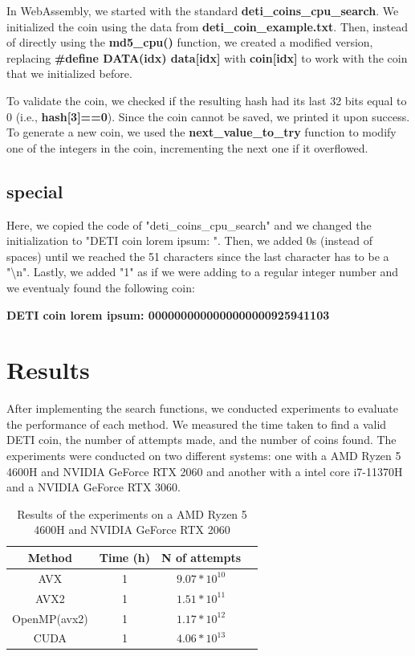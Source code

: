 \documentclass[a4paper,12pt]{article}
\begin{document}
In WebAssembly, we started with the standard \textbf{deti\_coins\_cpu\_search}. 
We initialized the coin using the data from \textbf{deti\_coin\_example.txt}. 
Then, instead of directly using the \textbf{md5\_cpu()} function, we created a modified version, 
replacing \textbf{\#define DATA(idx) data[idx]} with \textbf{coin[idx]} to work with the coin that we initialized before.

To validate the coin, we checked if the resulting hash had its last 32 bits equal to 0 (i.e., \textbf{hash[3]==0}). 
Since the coin cannot be saved, we printed it upon success. 
To generate a new coin, we used the \textbf{next\_value\_to\_try} function to modify one of the integers in the coin, 
incrementing the next one if it overflowed.

\subsection{special}
\label{subsec:special}

Here, we copied the code of "deti\_coins\_cpu\_search" and we changed the initialization to "DETI coin lorem ipsum: ". 
Then, we added 0s (instead of spaces) until we reached the 51 characters since the last character has to be a "\textbackslash n". 
Lastly, we added "1" as if we were adding to a regular integer number and we eventualy found the following coin:

\textbf{DETI coin lorem ipsum: 0000000000000000000925941103}

\section{Results}
\label{sec:results}

After implementing the search functions, we conducted experiments to evaluate the performance
of each method. We measured the time taken to find a valid DETI coin, the number of attempts
made, and the number of coins found. The experiments were conducted on two different systems:
one with a AMD Ryzen 5 4600H and NVIDIA GeForce RTX 2060 and another with a intel core i7-11370H and a NVIDIA GeForce RTX 
3060.

\begin{table}[H]
    \centering
    \begin{tabular}{|c|c|c|c|}
        \hline
        \textbf{Method} & \textbf{Time (h)} & \textbf{N of attempts}\\
        \hline
        AVX & 1 & $9.07*10^{10}$   \\
        AVX2 & 1 & $1.51*10^{11}$ \\
        OpenMP(avx2) & 1 & $1.17*10^{12}$ \\
        CUDA & 1 & $4.06*10^{13}$   \\
        \hline
    \end{tabular}
    \caption{Results of the experiments on a AMD Ryzen 5 4600H and NVIDIA GeForce RTX 2060}
    \label{tab:results1}
\end{table}
\end{document}
